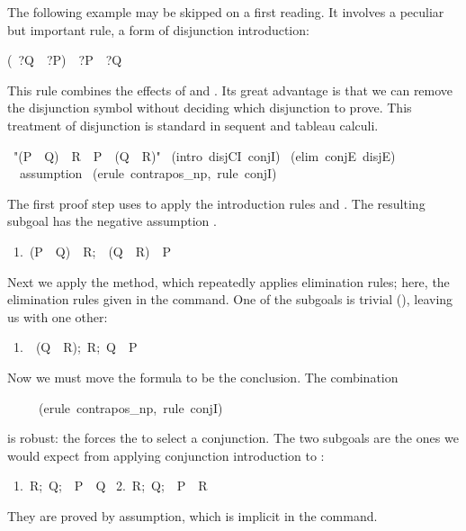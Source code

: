 \medskip

The following example may be skipped on a first reading.  It involves a
peculiar but important rule, a form of disjunction introduction:
\begin{isabelle}
(\isasymnot \ ?Q\ \isasymLongrightarrow \ ?P)\ \isasymLongrightarrow \ ?P\ \isasymor \ ?Q%
\end{isabelle}
This rule combines the effects of  and .  Its great
advantage is that we can remove the disjunction symbol without deciding
which disjunction to prove.  This treatment of disjunction is standard in sequent
and tableau calculi.

\begin{isabelle}
\ "(P\ \isasymor\ Q)\ \isasymand\ R\
\isasymLongrightarrow\ P\ \isasymor\ (Q\ \isasymand\ R)"\isanewline
{}\ (intro\ disjCI\ conjI)\isanewline
{}\ (elim\ conjE\ disjE)\isanewline
\ \isacommand{apply}\ assumption
\isanewline
{}\ (erule\ contrapos_np,\ rule\ conjI)
\end{isabelle}
%
The first proof step uses  to apply
the introduction rules  and .  The resulting
subgoal has the negative assumption 
\hbox{}.  

\begin{isabelle}
\ 1.\ \isasymlbrakk(P\ \isasymor\ Q)\ \isasymand\ R;\ \isasymnot\ (Q\ \isasymand\
R)\isasymrbrakk\ \isasymLongrightarrow\ P%
\end{isabelle}
Next we apply the  method, which repeatedly applies 
elimination rules; here, the elimination rules given 
in the command.  One of the subgoals is trivial (\isa{\isacommand{apply} assumption}),
leaving us with one other:
\begin{isabelle}
\ 1.\ \isasymlbrakk{\isasymnot}\ (Q\ \isasymand\ R);\ R;\ Q\isasymrbrakk\ \isasymLongrightarrow\ P%
\end{isabelle}
%
Now we must move the formula  to be the conclusion.  The
combination 
\begin{isabelle}
\ \ \ \ \ (erule\ contrapos_np,\ rule\ conjI)
\end{isabelle}
is robust: the  forces the  to select a
conjunction.  The two subgoals are the ones we would expect from applying
conjunction introduction to
\isa{Q~\isasymand~R}:  
\begin{isabelle}
\ 1.\ \isasymlbrakk R;\ Q;\ \isasymnot\ P\isasymrbrakk\ \isasymLongrightarrow\
Q\isanewline
\ 2.\ \isasymlbrakk R;\ Q;\ \isasymnot\ P\isasymrbrakk\ \isasymLongrightarrow\ R%
\end{isabelle}
They are proved by assumption, which is implicit in the 
command.%


